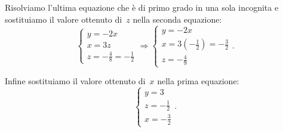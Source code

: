 \begin{soluzione}
Risolviamo l'ultima equazione che è di primo grado in
una sola incognita e sostituiamo il valore ottenuto di~$z$ nella seconda equazione:
\[\left\{\begin{array}{l}y=-2x
\\x=3z \\z=-{\frac{4}{8}}=-{\frac{1}{2}}
\end{array}\right.
\Rightarrow\left\{\begin{array}{l}y=-2x
\\x=3\left(-{\frac{1}{2}}\right)=-{\frac{3}{2}}
\\z=-{\frac{4}{9}} \end{array}\right..\]

Infine sostituiamo il valore ottenuto di~$x$ nella prima equazione:
\[\left\{\begin{array}{l}y=3\\z=-{\frac{1}{2}}\\x=-{\frac{3}{2}}\end{array}\right..\]
\end{soluzione}
\pagebreak
